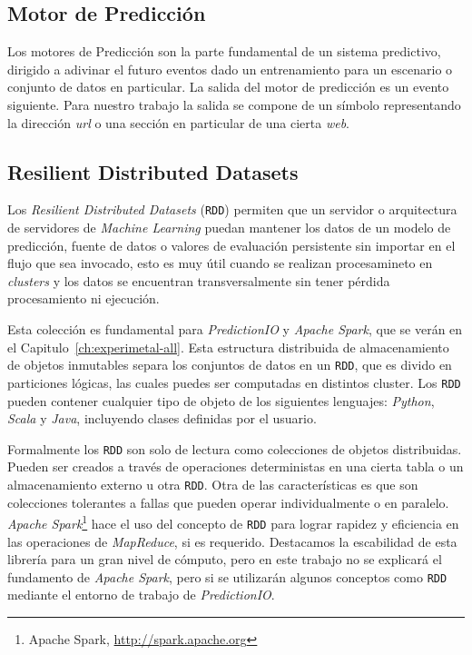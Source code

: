 \subsection{Motor de Predicción}\label{concept-enginepredict}

Los motores de Predicción son la parte fundamental de un sistema predictivo, dirigido a adivinar el futuro eventos dado un entrenamiento para un escenario o conjunto de datos en particular. La salida del motor de predicción es un evento siguiente. Para nuestro trabajo la salida se compone de un símbolo representando la dirección \emph{url} o una sección en particular de una cierta \emph{web}. 

 


\subsection{Resilient Distributed Datasets}\label{concept-RDD}

	Los \emph{Resilient Distributed Datasets} (\texttt{RDD}) permiten que un servidor o arquitectura de servidores de \emph{Machine Learning} puedan mantener los datos de un modelo de predicción, fuente de datos o valores de evaluación persistente sin importar en el flujo que sea invocado, esto es muy útil cuando se realizan procesamineto en \emph{clusters} y los datos se encuentran transversalmente sin tener pérdida procesamiento ni ejecución.

	Esta colección es fundamental para \emph{PredictionIO} y \emph{Apache Spark}, que se verán en el Capitulo~\ref{ch:experimetal-all}. Esta estructura distribuida de almacenamiento de objetos inmutables separa los conjuntos de datos en un \texttt{RDD}\cite{zaharia2010}, que  es divido en particiones lógicas, las cuales puedes ser computadas en distintos cluster. Los \texttt{RDD} pueden contener cualquier tipo de objeto de los siguientes lenguajes: \emph{Python}, \emph{Scala} y \emph{Java}, incluyendo clases definidas por el usuario. 

	Formalmente los \texttt{RDD} son solo de lectura como colecciones de objetos distribuidas. Pueden ser creados a través de  operaciones deterministas en una cierta tabla o un almacenamiento externo u otra \texttt{RDD}.
	Otra de las características es que son colecciones tolerantes a fallas que pueden operar individualmente o en paralelo.
	\emph{Apache Spark}\footnote{Apache Spark, \url{http://spark.apache.org}} hace el uso del concepto de \texttt{RDD} para lograr rapidez y eficiencia en las operaciones de \emph{MapReduce}, si es requerido. Destacamos la escabilidad de esta librería para un gran nivel de cómputo, pero en este trabajo no se explicará el fundamento de \emph{Apache Spark}, pero si se utilizarán algunos conceptos como \texttt{RDD} mediante el entorno de trabajo de \emph{PredictionIO}.



